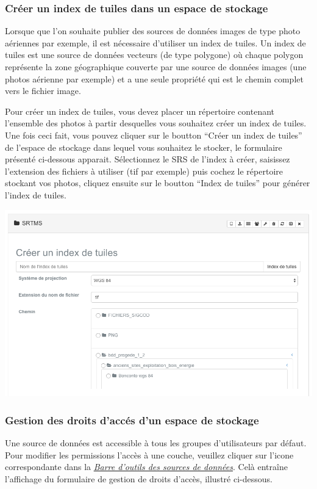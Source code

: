 \documentclass[letterpaper,10pt,french]{sphinxmanual}
\begin{document}
\subsubsection{Créer un index de tuiles dans un espace de stockage}
\label{data/datastores:creer-un-index-de-tuiles-dans-un-espace-de-stockage}
Lorsque que l'on souhaite publier des sources de données images de
type photo aériennes par exemple, il est nécessaire d'utiliser un
index de tuiles. Un index de tuiles est une source de données vecteurs
(de type polygone) où chaque polygon représente la zone géographique
couverte par une source de données images (une photos aérienne par
exemple) et a une seule propriété qui est le chemin complet vers le
fichier image.

Pour créer un index de tuiles, vous devez placer un répertoire
contenant l'ensemble des photos à partir desquelles vous souhaitez
créer un index de tuiles. Une fois ceci fait, vous pouvez cliquer sur
le boutton ``Créer un index de tuiles'' de l'espace de stockage dans
lequel vous souhaitez le stocker, le formulaire présenté ci-dessous
apparait. Sélectionnez le SRS de l'index à créer, saisissez
l'extension des fichiers à utiliser (tif par exemple) puis cochez le
répertoire stockant vos photos, cliquez ensuite sur le boutton ``Index
de tuiles'' pour générer l'index de tuiles.

\includegraphics[width=1.000\linewidth]{data-tileindex.png}


\subsubsection{Gestion des droits d'accés d'un espace de stockage}
\label{data/datastores:gestion-des-droits-d-acces-d-un-espace-de-stockage}
Une source de données est accessible à tous les groupes d'utilisateurs
par défaut. Pour modifier les permissions l'accès à une couche,
veuillez cliquer sur l'icone correspondante dans la
{\hyperref[data/datasources:datasource-table-label]{\emph{Barre d'outils des sources de données}}}. Celà entraîne l'affichage du formulaire
de gestion de droits d'accès, illustré ci-dessous.
\end{document}

